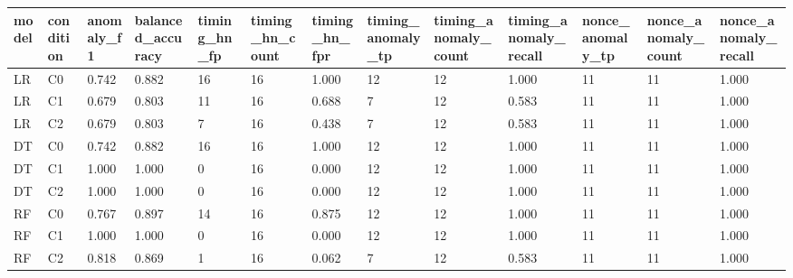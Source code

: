 \begin{tabular}{lllllllllllll}
\toprule
model & condition & anomaly\_f1 & balanced\_accuracy & timing\_hn\_fp & timing\_hn\_count & timing\_hn\_fpr & timing\_anomaly\_tp & timing\_anomaly\_count & timing\_anomaly\_recall & nonce\_anomaly\_tp & nonce\_anomaly\_count & nonce\_anomaly\_recall \\
\midrule
LR & C0 & 0.742 & 0.882 & 16 & 16 & 1.000 & 12 & 12 & 1.000 & 11 & 11 & 1.000 \\
LR & C1 & 0.679 & 0.803 & 11 & 16 & 0.688 & 7 & 12 & 0.583 & 11 & 11 & 1.000 \\
LR & C2 & 0.679 & 0.803 & 7 & 16 & 0.438 & 7 & 12 & 0.583 & 11 & 11 & 1.000 \\
DT & C0 & 0.742 & 0.882 & 16 & 16 & 1.000 & 12 & 12 & 1.000 & 11 & 11 & 1.000 \\
DT & C1 & 1.000 & 1.000 & 0 & 16 & 0.000 & 12 & 12 & 1.000 & 11 & 11 & 1.000 \\
DT & C2 & 1.000 & 1.000 & 0 & 16 & 0.000 & 12 & 12 & 1.000 & 11 & 11 & 1.000 \\
RF & C0 & 0.767 & 0.897 & 14 & 16 & 0.875 & 12 & 12 & 1.000 & 11 & 11 & 1.000 \\
RF & C1 & 1.000 & 1.000 & 0 & 16 & 0.000 & 12 & 12 & 1.000 & 11 & 11 & 1.000 \\
RF & C2 & 0.818 & 0.869 & 1 & 16 & 0.062 & 7 & 12 & 0.583 & 11 & 11 & 1.000 \\
\bottomrule
\end{tabular}
